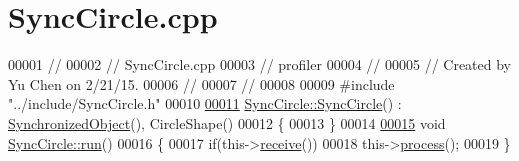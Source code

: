 \hypertarget{_sync_circle_8cpp_source}{}\section{Sync\+Circle.\+cpp}
\label{_sync_circle_8cpp_source}

\begin{DoxyCode}
00001 \textcolor{comment}{//}
00002 \textcolor{comment}{//  SyncCircle.cpp}
00003 \textcolor{comment}{//  profiler}
00004 \textcolor{comment}{//}
00005 \textcolor{comment}{//  Created by Yu Chen on 2/21/15.}
00006 \textcolor{comment}{//}
00007 \textcolor{comment}{//}
00008 
00009 \textcolor{preprocessor}{#include "../include/SyncCircle.h"}
00010 
\hypertarget{_sync_circle_8cpp_source_l00011}{}\hyperlink{class_sync_circle_ac4137a95bfb88c1014059c57ceb92d2c}{00011} \hyperlink{class_sync_circle_ac4137a95bfb88c1014059c57ceb92d2c}{SyncCircle::SyncCircle}()  : \hyperlink{namespacedsf_acbf1798fc56cfb1707162a17e13f5fda}{SynchronizedObject}(), CircleShape()
00012 \{
00013 \}
00014 
\hypertarget{_sync_circle_8cpp_source_l00015}{}\hyperlink{class_sync_circle_aa3087260d193fe4fee75b2adcfb986a3}{00015} \textcolor{keywordtype}{void} \hyperlink{class_sync_circle_aa3087260d193fe4fee75b2adcfb986a3}{SyncCircle::run}()
00016 \{
00017     \textcolor{keywordflow}{if}(this->\hyperlink{classdsf_1_1_synchronized_object_a3ce496c6aaecc4b0ca3a4d09539a4920}{receive}())
00018         this->\hyperlink{classdsf_1_1_task_box_ad35070ac305146aaa4073b2078d9209e}{process}();
00019 \}
\end{DoxyCode}
